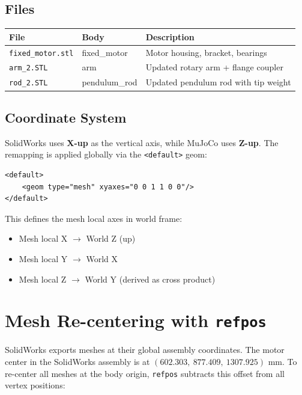 \documentclass[12pt,a4paper]{article}
\begin{document}
\subsection*{Files}
\begin{center}
\begin{tabular}{lll}
\toprule
\textbf{File} & \textbf{Body} & \textbf{Description} \\
\midrule
\texttt{fixed\_motor.stl} & fixed\_motor & Motor housing, bracket, bearings \\
\texttt{arm\_2.STL}       & arm          & Updated rotary arm + flange coupler \\
\texttt{rod\_2.STL}       & pendulum\_rod & Updated pendulum rod with tip weight \\
\bottomrule
\end{tabular}
\end{center}

\subsection*{Coordinate System}
SolidWorks uses \textbf{X-up} as the vertical axis, while MuJoCo uses \textbf{Z-up}.
The remapping is applied globally via the \texttt{<default>} geom:

\begin{lstlisting}[style=xml]
<default>
    <geom type="mesh" xyaxes="0 0 1 1 0 0"/>
</default>
\end{lstlisting}

\noindent This defines the mesh local axes in world frame:
\begin{itemize}
    \item Mesh local X $\rightarrow$ World Z (up)
    \item Mesh local Y $\rightarrow$ World X
    \item Mesh local Z $\rightarrow$ World Y (derived as cross product)
\end{itemize}

\section{Mesh Re-centering with \texttt{refpos}}

SolidWorks exports meshes at their global assembly coordinates.
The motor center in the SolidWorks assembly is at $(602.303,\ 877.409,\ 1307.925)$ mm.
To re-center all meshes at the body origin, \texttt{refpos} subtracts this offset from all vertex positions:
\end{document}
